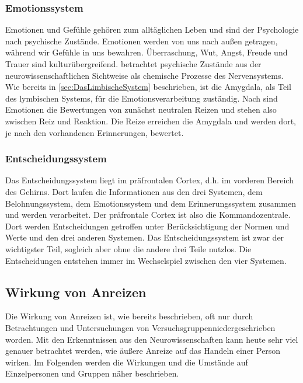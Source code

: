 \subsubsection{Emotionssystem}

Emotionen und Gefühle gehören zum alltäglichen Leben und sind der Psychologie nach  psychische Zustände. Emotionen werden von uns nach außen getragen, während wir Gefühle in uns bewahren. Überraschung, Wut, Angst, Freude und Trauer sind kulturübergreifend. \citep[S. 67]{Nowka.2013}
\citet[S. 17]{Seelbach.2011} betrachtet psychische Zustände aus der neurowissenschaftlichen Sichtweise als chemische Prozesse des Nervensystems. Wie bereits in \ref{sec:DasLimbischeSystem} beschrieben, ist die Amygdala, als Teil des lymbischen Systems, für die Emotionsverarbeitung zuständig. 
Nach \citet[S. 18]{Seelbach.2011} sind Emotionen die Bewertungen von zunächst neutralen Reizen und stehen also zwischen Reiz und Reaktion. Die Reize erreichen die Amygdala und werden dort, je nach den vorhandenen Erinnerungen, bewertet.

\subsubsection{Entscheidungssystem}
Das Entscheidungssystem liegt im präfrontalen Cortex, d.h. im vorderen Bereich des Gehirns. Dort laufen die Informationen aus den drei Systemen, dem Belohnungssystem, dem Emotionssystem und dem Erinnerungssystem zusammen und werden verarbeitet. Der präfrontale Cortex ist also die Kommandozentrale. Dort werden Entscheidungen getroffen unter Berücksichtigung der Normen und Werte und den drei anderen Systemen. Das Entscheidungssystem ist zwar der wichtigster Teil, sogleich aber ohne die andere drei Teile nutzlos. Die Entscheidungen entstehen immer im Wechselspiel zwischen den vier Systemen. \citep[S. 19]{Seelbach.2011}

\subsection{Wirkung von Anreizen}
Die Wirkung von Anreizen ist, wie bereits beschrieben, oft nur durch Betrachtungen und Untersuchungen von \glqq Versuchsgruppen\grqq niedergeschrieben worden. Mit den Erkenntnissen aus den Neurowissenschaften kann heute sehr viel genauer betrachtet werden, wie äußere Anreize auf das Handeln einer Person wirken. Im Folgenden werden die Wirkungen und die Umstände auf Einzelpersonen und Gruppen näher beschrieben.

